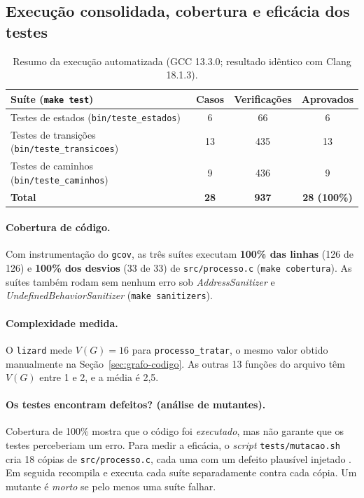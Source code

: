 \documentclass[11pt,a4paper]{article}
\theoremstyle{definition}
\newcommand{\VG}{V(G)}
\begin{document}
\subsection{Execução consolidada, cobertura e eficácia dos testes}\label{sec:execucao}

\begin{table}[H]
\centering\small
\begin{tabularx}{\textwidth}{Lccc}
\toprule
Suíte (\texttt{make test}) & Casos & Verificações & Aprovados \\
\midrule
Testes de estados (\texttt{bin/teste\_estados})         & 6  & 66  & 6 \\
Testes de transições (\texttt{bin/teste\_transicoes})   & 13 & 435 & 13 \\
Testes de caminhos (\texttt{bin/teste\_caminhos})       & 9  & 436 & 9 \\
\midrule
\textbf{Total} & \textbf{28} & \textbf{937} & \textbf{28 (100\%)} \\
\bottomrule
\end{tabularx}
\caption{Resumo da execução automatizada (GCC 13.3.0; resultado idêntico com Clang 18.1.3).}
\label{tab:resumo}
\end{table}

\paragraph{Cobertura de código.} Com instrumentação do \texttt{gcov}, as três suítes executam
\textbf{100\% das linhas} (126 de 126) e \textbf{100\% dos desvios} (33 de 33) de
\texttt{src/processo.c} (\texttt{make cobertura}). As suítes também rodam sem nenhum erro sob
\emph{AddressSanitizer} e \emph{UndefinedBehaviorSanitizer} (\texttt{make sanitizers}).

\paragraph{Complexidade medida.} O \texttt{lizard} mede $\VG = 16$ para \texttt{processo\_tratar},
o mesmo valor obtido manualmente na Seção~\ref{sec:grafo-codigo}. As outras 13 funções do arquivo
têm $\VG$ entre 1 e 2, e a média é 2,5.

\paragraph{Os testes encontram defeitos? (análise de mutantes).} Cobertura de 100\% mostra que o
código foi \emph{executado}, mas não garante que os testes perceberiam um erro. Para medir a
eficácia, o \emph{script} \texttt{tests/mutacao.sh} cria 18 cópias de \texttt{src/processo.c}, cada
uma com um defeito plausível injetado \cite{jia}. Em seguida recompila e executa cada suíte
separadamente contra cada cópia. Um mutante é \emph{morto} se pelo menos uma suíte falhar.
\end{document}
